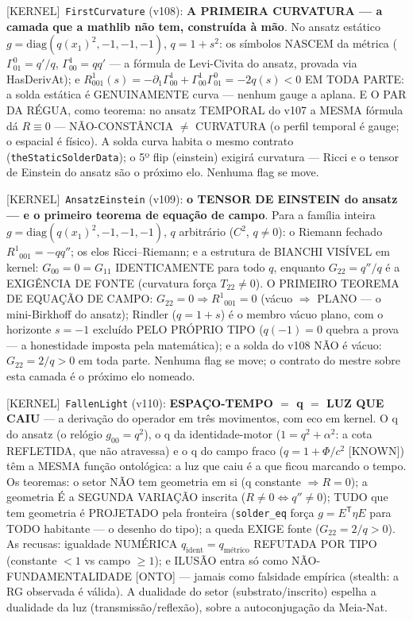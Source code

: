 \documentclass[11pt]{article}
\providecommand{\kernelmk}[1]{\textsf{[KERNEL]}~\texttt{#1}}\providecommand{\knownmk}[1]{\textsf{[KNOWN]}~{#1}}\providecommand{\statusmk}[1]{\textsf{[#1]}}
\theoremstyle{definition}\newtheorem{deriv}{Derivação}
\begin{document}
\kernelmk{FirstCurvature} (v108): \textbf{A PRIMEIRA CURVATURA --- a camada que a mathlib não tem, construída à mão}. No ansatz estático $g=\mathrm{diag}(q(x_1)^2,-1,-1,-1)$, $q=1+s^2$: os símbolos NASCEM da métrica ($\Gamma^0_{01}=q'/q$, $\Gamma^1_{00}=qq'$ --- a fórmula de Levi-Civita do ansatz, provada via HasDerivAt); e $R^1_{001}(s)=-\partial_1\Gamma^1_{00}+\Gamma^1_{00}\Gamma^0_{01}=-2q(s)<0$ EM TODA PARTE: a solda estática é GENUINAMENTE curva --- nenhum gauge a aplana. E O PAR DA RÉGUA, como teorema: no ansatz TEMPORAL do v107 a MESMA fórmula dá $R\equiv 0$ --- NÃO-CONSTÂNCIA $\neq$ CURVATURA (o perfil temporal é gauge; o espacial é físico). A solda curva habita o mesmo contrato (\texttt{theStaticSolderData}); o 5º flip (einstein) exigirá curvatura --- Ricci e o tensor de Einstein do ansatz são o próximo elo. Nenhuma flag se move.

\kernelmk{AnsatzEinstein} (v109): \textbf{o TENSOR DE EINSTEIN do ansatz --- e o primeiro teorema de equação de campo}. Para a família inteira $g=\mathrm{diag}(q(x_1)^2,-1,-1,-1)$, $q$ arbitrário ($C^2$, $q\neq 0$): o Riemann fechado $R^1{}_{001}=-qq''$; os elos Ricci--Riemann; e a estrutura de BIANCHI VISÍVEL em kernel: $G_{00}=0=G_{11}$ IDENTICAMENTE para todo $q$, enquanto $G_{22}=q''/q$ é a EXIGÊNCIA DE FONTE (curvatura força $T_{22}\neq 0$). O PRIMEIRO TEOREMA DE EQUAÇÃO DE CAMPO: $G_{22}=0\Rightarrow R^1{}_{001}=0$ (vácuo $\Rightarrow$ PLANO --- o mini-Birkhoff do ansatz); Rindler ($q=1+s$) é o membro vácuo plano, com o horizonte $s=-1$ excluído PELO PRÓPRIO TIPO ($q(-1)=0$ quebra a prova --- a honestidade imposta pela matemática); e a solda do v108 NÃO é vácuo: $G_{22}=2/q>0$ em toda parte. Nenhuma flag se move; o contrato do mestre sobre esta camada é o próximo elo nomeado.

\kernelmk{FallenLight} (v110): \textbf{ESPAÇO-TEMPO $=$ q $=$ LUZ QUE CAIU} --- a derivação do operador em três movimentos, com eco em kernel. O q do ansatz (o relógio $g_{00}=q^2$), o q da identidade-motor ($1=q^2+\alpha^2$: a cota REFLETIDA, que não atravessa) e o q do campo fraco ($q=1+\Phi/c^2$ [KNOWN]) têm a MESMA função ontológica: a luz que caiu é a que ficou marcando o tempo. Os teoremas: o setor NÃO tem geometria em si (q constante $\Rightarrow R=0$); a geometria É a SEGUNDA VARIAÇÃO inscrita ($R\neq 0\Leftrightarrow q''\neq 0$); TUDO que tem geometria é PROJETADO pela fronteira (\texttt{solder\_eq} força $g=E^{\mathsf{T}}\eta E$ para TODO habitante --- o desenho do tipo); a queda EXIGE fonte ($G_{22}=2/q>0$). As recusas: igualdade NUMÉRICA $q_{\mathrm{ident}}=q_{\mathrm{métrico}}$ REFUTADA POR TIPO (constante $<1$ vs campo $\ge 1$); e ILUSÃO entra só como NÃO-FUNDAMENTALIDADE [ONTO] --- jamais como falsidade empírica (stealth: a RG observada é válida). A dualidade do setor (substrato/inscrito) espelha a dualidade da luz (transmissão/reflexão), sobre a autoconjugação da Meia-Nat.
\end{document}
